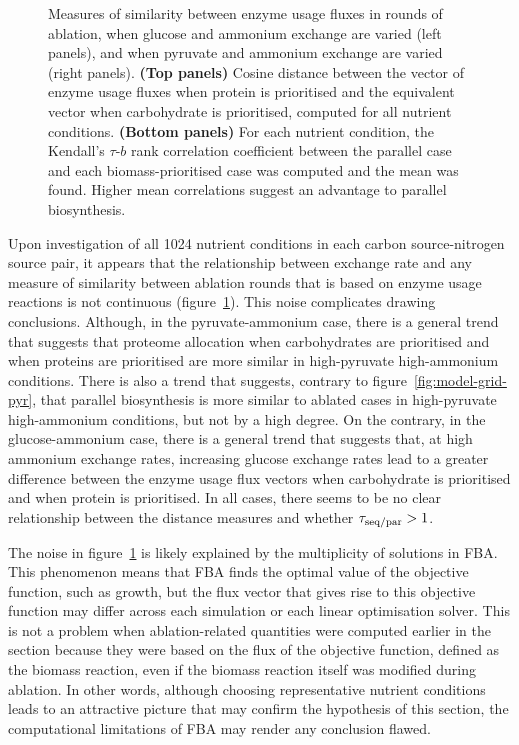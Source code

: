 \begin{figure}
  \caption{
    Measures of similarity between enzyme usage fluxes in rounds of ablation, when glucose and ammonium exchange are varied (left panels), and when pyruvate and ammonium exchange are varied (right panels).
    \textbf{(Top panels)} Cosine distance between the vector of enzyme usage fluxes when protein is prioritised and the equivalent vector when carbohydrate is prioritised, computed for all nutrient conditions.
    \textbf{(Bottom panels)} For each nutrient condition, the Kendall's $\tau$-$b$ rank correlation coefficient between the parallel case and each biomass-prioritised case was computed and the mean was found.
    Higher mean correlations suggest an advantage to parallel biosynthesis.
  }
  \label{fig:model-noisy}
\end{figure}

Upon investigation of all \num{1024} nutrient conditions in each carbon source-nitrogen source pair, it appears that the relationship between exchange rate and any measure of similarity between ablation rounds that is based on enzyme usage reactions is not continuous (figure~\ref{fig:model-noisy}).
This noise complicates drawing conclusions.
Although, in the pyruvate-ammonium case, there is a general trend that suggests that proteome allocation when carbohydrates are prioritised and when proteins are prioritised are more similar in high-pyruvate high-ammonium conditions.
There is also a trend that suggests, contrary to figure~\ref{fig:model-grid-pyr}, that parallel biosynthesis is more similar to ablated cases in high-pyruvate high-ammonium conditions, but not by a high degree.
On the contrary, in the glucose-ammonium case, there is a general trend that suggests that, at high ammonium exchange rates, increasing glucose exchange rates lead to a greater difference between the enzyme usage flux vectors when carbohydrate is prioritised and when protein is prioritised.
In all cases, there seems to be no clear relationship between the distance measures and whether $\tau_{\mathrm{seq}/\mathrm{par}} > 1$.

The noise in figure~\ref{fig:model-noisy} is likely explained by the multiplicity of solutions in FBA.
This phenomenon means that FBA finds the optimal value of the objective function, such as growth, but the flux vector that gives rise to this objective function may differ across each simulation or each linear optimisation solver.
This is not a problem when ablation-related quantities were computed earlier in the section because they were based on the flux of the objective function, defined as the biomass reaction, even if the biomass reaction itself was modified during ablation.
In other words, although choosing representative nutrient conditions leads to an attractive picture that may confirm the hypothesis of this section, the computational limitations of FBA may render any conclusion flawed.


